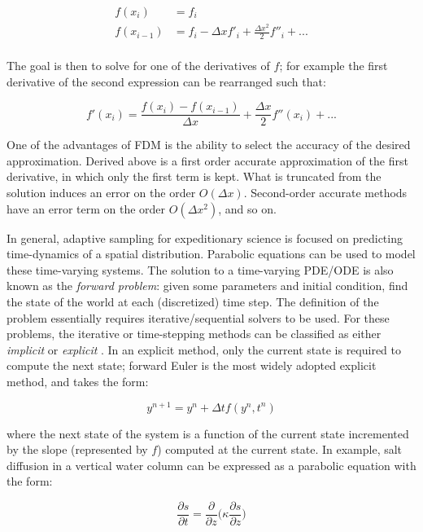 \begin{align}
	f(x_i) &= f_i\\
	f(x_{i-1}) &= f_i - \Delta x f'_i + \frac{\Delta x^2}{2}f''_i + ...\\
\end{align}

The goal is then to solve for one of the derivatives of $f$; for example the first derivative of the second expression can be rearranged such that:

\begin{equation}
	f'(x_i) = \frac{f(x_i) - f(x_{i-1})}{\Delta x} + \frac{\Delta x}{2}f''(x_i) + ...
\end{equation}

One of the advantages of FDM is the ability to select the accuracy of the desired approximation. Derived above is a first order accurate approximation of the first derivative, in which only the first term is kept. What is truncated from the solution induces an error on the order $O(\Delta x)$. Second-order accurate methods have an error term on the order $O(\Delta x^2)$, and so on.

In general, adaptive sampling for expeditionary science is focused on predicting time-dynamics of a spatial distribution. Parabolic equations can be used to model these time-varying systems. The solution to a time-varying PDE/ODE is also known as the \emph{forward problem}: given some parameters and initial condition, find the state of the world at each (discretized) time step. The definition of the problem essentially requires iterative/sequential solvers to be used. For these problems, the iterative or time-stepping methods can be classified as either \emph{implicit} or \emph{explicit} \autocite{biswas2013discussion,hahn1991modified}. In an explicit method, only the current state is required to compute the next state; forward Euler is the most widely adopted explicit method, and takes the form:

\begin{equation}
	y^{n+1} = y^n + \Delta t f(y^n,t^n)
\end{equation}

\noindent where the next state of the system is a function of the current state incremented by the slope (represented by $f$) computed at the current state. In example, salt diffusion in a vertical water column can be expressed as a parabolic equation with the form:

\begin{equation}
	\frac{\partial s}{\partial t} = \frac{\partial}{\partial z}\Big(\kappa \frac{\partial s}{\partial z}\Big)
	\label{eqn:salt}
\end{equation}

